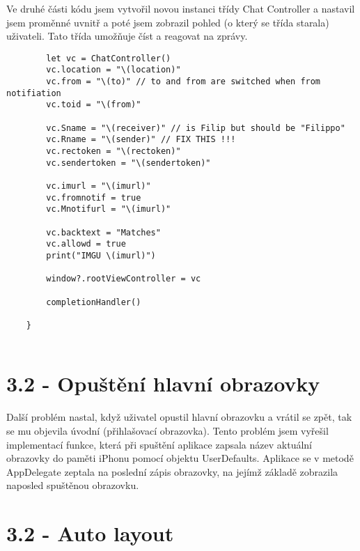 \documentclass{article}
\begin{document}
        
        
    \vspace{10 mm}    
Ve druhé části kódu jsem vytvořil novou instanci třídy Chat Controller a nastavil jsem proměnné uvnitř a poté jsem zobrazil pohled (o který se třída starala) uživateli. Tato třída umožňuje číst a reagovat na zprávy.



\vspace{10 mm}
        \begin{verbatim}
        let vc = ChatController()
        vc.location = "\(location)"
        vc.from = "\(to)" // to and from are switched when from notifiation
        vc.toid = "\(from)"
        
        vc.Sname = "\(receiver)" // is Filip but should be "Filippo"
        vc.Rname = "\(sender)" // FIX THIS !!!
        vc.rectoken = "\(rectoken)"
        vc.sendertoken = "\(sendertoken)"
        
        vc.imurl = "\(imurl)"
        vc.fromnotif = true
        vc.Mnotifurl = "\(imurl)"
        
        vc.backtext = "Matches"
        vc.allowd = true
        print("IMGU \(imurl)")
        
        window?.rootViewController = vc
        
        completionHandler()
        
    }


       \end{verbatim}





\vspace{10 mm}
\section{3.2 - Opuštění hlavní obrazovky}

Další problém nastal, když uživatel opustil hlavní obrazovku a vrátil se zpět, tak se mu objevila úvodní (přihlašovací obrazovka). Tento problém jsem vyřešil implementací funkce, která při spuštění aplikace zapsala název aktuální obrazovky do paměti iPhonu pomocí objektu UserDefaults. Aplikace se v metodě AppDelegate zeptala na poslední zápis obrazovky, na jejímž základě zobrazila naposled spuštěnou obrazovku.


\vspace{10 mm}
\section{3.2 - Auto layout}
\end{document}
